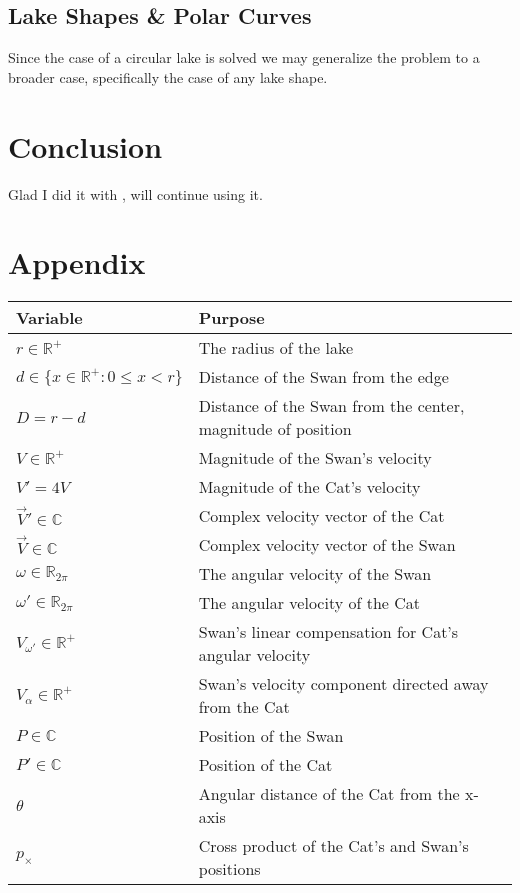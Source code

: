 \documentclass[12pt]{article}
\begin{document}
\subsection{Lake Shapes \& Polar Curves}

Since the case of a circular lake is solved we may generalize the problem to a broader case, specifically the case of any lake shape.

\section{Conclusion}
Glad I did it with \LaTeXe\cite{latex2e}, will continue using it.

\section*{Appendix}

\begin{tabular}{|l|l|}
\hline
\textbf{Variable} & \textbf{Purpose}\\
\hline
$r \in {\mathbb{R}^+}$ & The radius of the lake\\
$d \in \{x \in \mathbb{R^+}: 0 \leq x < r \}$ & Distance of the Swan from the edge\\
$D = r - d$ & Distance of the Swan from the center, magnitude of position\\
$V \in {\mathbb{R}^+}$ & Magnitude of the Swan's velocity\\
$V' = 4V$ & Magnitude of the Cat's velocity\\
$\vec{V}' \in \mathbb{C}$ & Complex velocity vector of the Cat\\
$\vec{V} \in \mathbb{C}$ & Complex velocity vector of the Swan\\
$\omega \in \mathbb{R}_{2\pi}$ & The angular velocity of the Swan\\
$\omega' \in \mathbb{R}_{2\pi}$ & The angular velocity of the Cat\\
$V_{\omega'} \in \mathbb{R^+}$ & Swan's linear compensation for Cat's angular velocity\\
$V_\alpha \in \mathbb{R^+}$ & Swan's velocity component directed away from the Cat\\
$P \in \mathbb{C}$ & Position of the Swan\\
$P' \in \mathbb{C}$ & Position of the Cat\\
$\theta$ & Angular distance of the Cat from the x-axis\\
$p_\times$ & Cross product of the Cat's and Swan's positions\\
\hline
\end{tabular}
\vspace{12pt}



\end{document}

